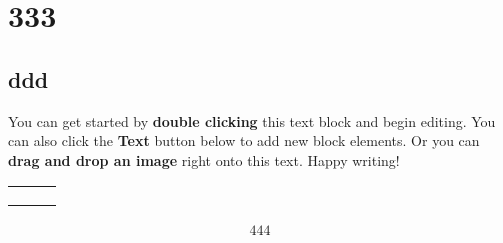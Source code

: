 \chapter{333}
\section{ddd}


You can get started by \textbf{double clicking} this text block and begin editing. You can also click the \textbf{Text} button below to add new block elements. Or you can \textbf{drag and drop an image} right onto this text. Happy writing!
\begin{table} 
    \begin{tabular}{ c c c }
         &  &  \\ 
         &  &  \\ 
         &  &  \\ 
    \end{tabular} 
\end{table}

\begin{align}
444
\end{align}